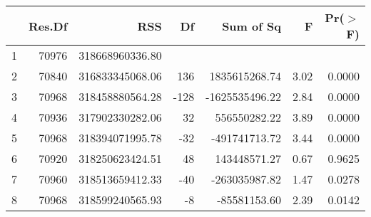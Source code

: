 \begin{table}[ht]
\centering
\begin{tabular}{lrrrrrr}
  \hline
 & Res.Df & RSS & Df & Sum of Sq & F & Pr($>$F) \\ 
  \hline
1 & 70976 & 318668960336.80 &  &  &  &  \\ 
  2 & 70840 & 316833345068.06 & 136 & 1835615268.74 & 3.02 & 0.0000 \\ 
  3 & 70968 & 318458880564.28 & -128 & -1625535496.22 & 2.84 & 0.0000 \\ 
  4 & 70936 & 317902330282.06 & 32 & 556550282.22 & 3.89 & 0.0000 \\ 
  5 & 70968 & 318394071995.78 & -32 & -491741713.72 & 3.44 & 0.0000 \\ 
  6 & 70920 & 318250623424.51 & 48 & 143448571.27 & 0.67 & 0.9625 \\ 
  7 & 70960 & 318513659412.33 & -40 & -263035987.82 & 1.47 & 0.0278 \\ 
  8 & 70968 & 318599240565.93 & -8 & -85581153.60 & 2.39 & 0.0142 \\ 
   \hline
\end{tabular}
\end{table}
